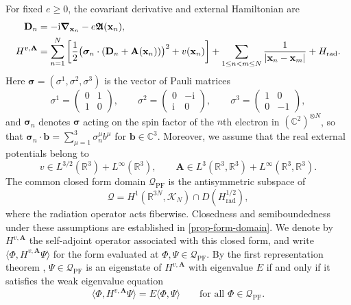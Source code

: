 \documentclass[final,reqno]{amsart}
\theoremstyle{remark}
\newcommand{\RR}{\mathbb{R}}
\newcommand{\CC}{\mathbb{C}}
\renewcommand{\i}{\mathrm{i}}
\newcommand{\dua}[2]{\langle #1, #2 \rangle}
\newcommand{\DC}{D}
\newcommand{\AF}{\bm{\mathfrak{A}}}
\newcommand{\PF}{\mathrm{PF}}
\newcommand{\rad}{\mathrm{rad}}
\newcommand{\vsigma}{{\bm{\sigma}}}
\newcommand{\vx}{\mathbf{x}}
\newcommand{\vA}{{\mathbf{A}}}
\newcommand{\vD}{{\mathbf{D}}}
\newcommand{\vb}{{\mathbf{b}}}
\begin{document}
For fixed $e\geq0$, the covariant derivative and external Hamiltonian are
\begin{align}
 \vD_n&=-\i\grad_{\vx_n}-e\AF(\vx_n),\notag\\
 H^{v,\vA}
 &=\sum_{n=1}^N\left[\frac12\bigl(\vsigma_n\cdot(\vD_n+\vA(\vx_n))\bigr)^2
                         +v(\vx_n)\right]
   +\sum_{1\leq n<m\leq N}\frac1{|\vx_n-\vx_m|}+H_\rad.
 \label{qvA-def}
\end{align}
Here $\vsigma=(\sigma^1,\sigma^2,\sigma^3)$ is the vector of Pauli
matrices
\[
 \sigma^1=\begin{pmatrix}0&1\\1&0\end{pmatrix},\qquad
 \sigma^2=\begin{pmatrix}0&-\i\\\i&0\end{pmatrix},\qquad
 \sigma^3=\begin{pmatrix}1&0\\0&-1\end{pmatrix},
\]
and $\vsigma_n$ denotes $\vsigma$ acting on the spin factor of
the $n$th electron in $(\CC^2)^{\otimes N}$, so that
$\vsigma_n\cdot\vb=\sum_{\mu=1}^3\sigma_n^\mu b^\mu$ for
$\vb\in\CC^3$.
Moreover, we assume that the real external potentials belong to
\begin{equation}\label{potential-spaces}
 v\in L^{3/2}(\RR^3)+L^\infty(\RR^3),\qquad
 \vA\in L^3(\RR^3,\RR^3)+L^\infty(\RR^3,\RR^3).
\end{equation}
The common closed form domain $\mathcal Q_\PF$ is the
antisymmetric subspace of
\begin{equation*}
 \mathcal Q
 =H^1(\RR^{3N},\mathcal K_N)\cap\DC(H_\rad^{1/2}),
\end{equation*}
where the radiation operator acts fiberwise.  Closedness and
semiboundedness under these assumptions are established in
\cref{prop-form-domain}.
We denote by $H^{v,\vA}$ the self-adjoint operator associated with this
closed form, and write $\dua{\Phi}{H^{v,\vA}\Psi}$ for the form
evaluated at $\Phi,\Psi\in\mathcal Q_\PF$.  By the first representation
theorem \cite[Theorem~VI.2.1]{kato1995perturbation}, $\Psi\in\mathcal Q_\PF$ is an eigenstate of $H^{v,\vA}$ with
eigenvalue $E$ if and only if it satisfies the weak eigenvalue equation
\begin{equation}\label{weak-eigenvalue-equation}
 \dua{\Phi}{H^{v,\vA}\Psi}=E\dua{\Phi}{\Psi}
 \qquad\text{for all }\Phi\in\mathcal Q_\PF.
\end{equation}
\end{document}
